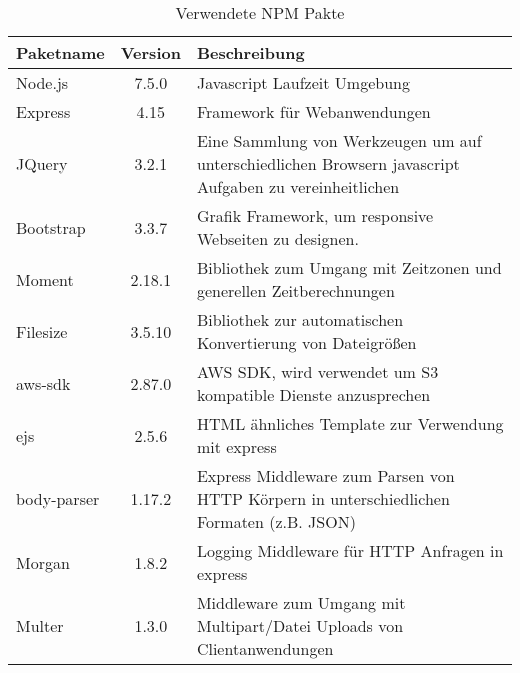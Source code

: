 \begin{table}
	\centering
	\label{tbl:npmpackages}
		\begin{tabular}{ l | c | p{10cm}}
			\hline
			Paketname & Version & Beschreibung \\ \hline
			Node.js & 7.5.0 & Javascript Laufzeit Umgebung \\
			Express & 4.15 & Framework für Webanwendungen \\
			JQuery & 3.2.1 & Eine Sammlung von Werkzeugen um auf unterschiedlichen Browsern javascript Aufgaben zu vereinheitlichen \\
			Bootstrap & 3.3.7 & Grafik Framework, um responsive Webseiten zu designen. \\
			Moment & 2.18.1 & Bibliothek zum Umgang mit Zeitzonen und generellen Zeitberechnungen \\
			Filesize & 3.5.10 & Bibliothek zur automatischen Konvertierung von Dateigrößen \\
			aws-sdk & 2.87.0 & AWS SDK, wird verwendet um S3 kompatible Dienste anzusprechen \\
			ejs & 2.5.6 & HTML ähnliches Template zur Verwendung mit express \\
			body-parser & 1.17.2 & Express Middleware zum Parsen von HTTP Körpern in unterschiedlichen Formaten (z.B. JSON)\\
			Morgan & 1.8.2 & Logging Middleware für HTTP Anfragen in express \\
			Multer & 1.3.0 & Middleware zum Umgang mit Multipart/Datei Uploads von Clientanwendungen
		\end{tabular}
		\caption{Verwendete NPM Pakte}
\end{table}


